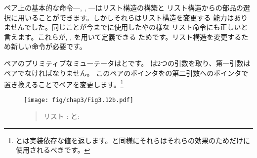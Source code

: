 ペア上の基本的な命令---, , ---はリスト構造の構築と
リスト構造からの部品の選択に用いることができます。しかしそれらはリスト構造を変更する
能力はありませんでした。同じことが今までに使用したやの様な
リスト命令にも正しいと言えます。これらが, , を用いて定義できる
ためです。リスト構造を変更するため新しい命令が必要です。



ペアのプリミティブなミューテータはとです。
は2つの引数を取り、第一引数はペアでなければなりません。
このペアのポインタをの第二引数へのポインタで置き換えることでペアを変更します。\footnote{
とは実装依存な値を返します。と同様にそれらはそれらの効果のためだけに
使用されるべきです。}

\begin{figure}[tp]
\label{Figure 3.12}
\centering
\begin{comment}
\heading{Figure 3.12:} Lists \code{x}: \code{((a b) c d)} and \code{y}: \code{(e f)}.

\begin{example}
     +---+---+     +---+---+     +---+---+
x -->| * | *-+---->| * | *-+---->| * | / |
     +-|-+---+     +-|-+---+     +-|-+---+
       |             V             V
       |           +---+         +---+
       |           | c |         | d |
       |           +---+         +---+
       |           +---+---+     +---+---+
       +---------->| * | *-+---->| * | / |
                   +-|-+---+     +-|-+---+
                     V             V
                   +---+         +---+
                   | a |         | b |
                   +---+         +---+
                   +---+---+     +---+---+
              y -->| * | *-+---->| * | / |
                   +-|-+---+     +-|-+---+
                     V             V
                   +---+         +---+
                   | e |         | f |
                   +---+         +---+
\end{example}
\end{comment}
\texttt{[image: fig/chap3/Fig3.12b.pdf]}
\begin{quote}
 リスト : と: 
\end{quote}
\end{figure}




